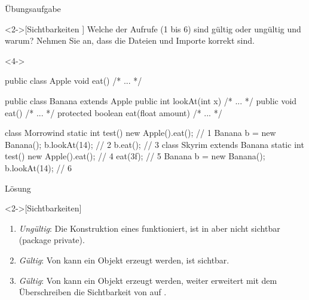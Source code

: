 \ifull
\begin{frame}[c,fragile]{Übungsaufgabe}
    \begin{exercise}<2->[Sichtbarkeiten ]
        Welche der Aufrufe (1 bis 6) sind gültig oder ungültig und warum? Nehmen Sie an, dass die Dateien und Importe korrekt sind.\medskip\par
\begin{onlyenv}<4->
\begin{minipage}{.7\linewidth}
%
\begin{plainjava}[morekeywords={[3]{Apple,Banana}},belowskip=4.5pt]
public class Apple { void eat() { /* ... */ } }

public class Banana extends Apple {
  public int lookAt(int x) { /* ... */ }
  public void eat() { /* ... */ }
  protected boolean eat(float amount) { /* ... */ }
}
\end{plainjava}
\begin{plainjava}[multicols=2,morekeywords={[3]{Apple,Banana,Skyrim,Morrowind}},aboveskip=4.5pt]
class Morrowind {
  static int test() {
    new Apple().eat(); // 1
    Banana b = new Banana();
    b.lookAt(14); // 2
    b.eat(); // 3
}}
class Skyrim extends Banana {
  static int test() {
    new Apple().eat(); // 4
    eat(3f); // 5
    Banana b = new Banana();
    b.lookAt(14); // 6
}}
\end{plainjava}
\end{minipage}%
\end{onlyenv}%
\hfill{}
    \end{exercise}
\end{frame}

\begin{frame}[c]{Lösung}
    \begin{solve}<2->[Sichtbarkeiten]
       \begin{enumerate}[<+(1)->]
            \item \emph{Ungültig}: Die Konstruktion eines  funktioniert,  ist in  aber nicht sichtbar (package private).
            \item \emph{Gültig}: Von  kann ein Objekt erzeugt werden,  ist  sichtbar.
            \item \emph{Gültig}: Von  kann ein Objekt erzeugt werden, weiter erweitert  mit dem Überschreiben die Sichtbarkeit von  auf .
       \end{enumerate}
    \end{solve}
\end{frame}

